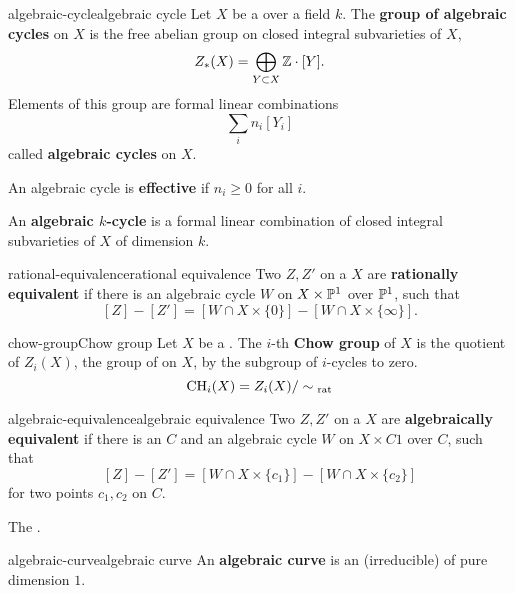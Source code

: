 \begin{topic}{algebraic-cycle}{algebraic cycle}
    Let $X$ be a  over a field $k$. The \textbf{group of algebraic cycles} on $X$ is the free abelian group on closed integral subvarieties of $X$,
    \[ Z_*(X) = \bigoplus_{Y \subset X} \mathbb{Z} \cdot [Y] . \] 
    Elements of this group are formal linear combinations
    \[ \sum_i n_i [Y_i] \]
    called \textbf{algebraic cycles} on $X$.
    
    An algebraic cycle is \textbf{effective} if $n_i \ge 0$ for all $i$.
    
    An \textbf{algebraic $k$-cycle} is a formal linear combination of closed integral subvarieties of $X$ of dimension $k$.
\end{topic}

\begin{topic}{rational-equivalence}{rational equivalence}
    Two  $Z, Z'$ on a  $X$ are \textbf{rationally equivalent} if there is an algebraic cycle $W$ on $X \times \mathbb{P}^1$  over $\mathbb{P}^1$, such that
    \[ [Z] - [Z'] = [W \cap X \times \{ 0 \}] - [W \cap X \times \{ \infty \}] . \]
\end{topic}

\begin{topic}{chow-group}{Chow group}
    Let $X$ be a . The $i$-th \textbf{Chow group} of $X$ is the quotient of $Z_i(X)$, the group of  on $X$, by the subgroup of $i$-cycles  to zero.
    \[ \textup{CH}_i(X) = Z_i(X) / \sim{}_\textup{rat} \]
\end{topic}

\begin{topic}{algebraic-equivalence}{algebraic equivalence}
    Two  $Z, Z'$ on a  $X$ are \textbf{algebraically equivalent} if there is an  $C$ and an algebraic cycle $W$ on $X \times C1$  over $C$, such that
    \[ [Z] - [Z'] = [W \cap X \times \{ c_1 \}] - [W \cap X \times \{ c_2 \}] \]
    for two points $c_1, c_2$ on $C$.
    
    The .
\end{topic}

\begin{topic}{algebraic-curve}{algebraic curve}
    An \textbf{algebraic curve} is an (irreducible)  of pure dimension $1$.
\end{topic}

